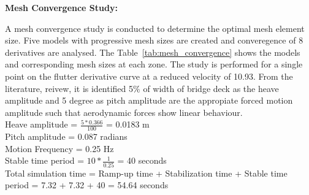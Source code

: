 \documentclass[a4paper, 12pt]{report}
\begin{document}
\vspace{0.5 cm}

\textbf{Mesh Convergence Study:} 

A mesh convergence study is conducted to determine the optimal mesh element size. Five models with progressive 
mesh sizes are created and converegence of 8 derivatives are analysed. The Table~\ref{tab:mesh_convergence} shows the models
and corresponding mesh sizes at each zone. The study is performed for a single point on the flutter derivative curve
at a reduced velocity of 10.93. From the literature, reivew, it is identified 5$\%$ of width of bridge deck as the heave amplitude 
and 5 degree as pitch amplitude are the appropiate forced motion amplitude such that aerodynamic forces show linear behaviour.  \\ [0.1cm]

Heave amplitude = $ \frac{5 * 0.366}{100} $ = 0.0183 m\\ [0.1cm]
Pitch amplitude = 0.087 radians\\ [0.1cm]
Motion Frequency = 0.25 Hz\\ [0.1cm] 
Stable time period = $ 10 * \frac{1}{0.25} $ = 40 seconds\\ [0.1cm]
Total simulation time = Ramp-up time + Stabilization time + Stable time period = 7.32 + 7.32 + 40 = 54.64 seconds\\ [0.1cm]
\end{document}
